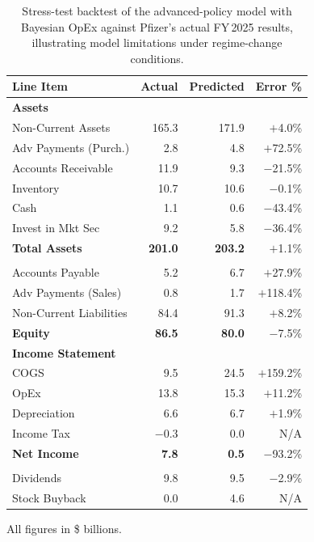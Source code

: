 \documentclass[12pt,a4paper]{article}
\begin{document}
\begin{table}[H]
\centering
\footnotesize

\begin{tabular}{l rrr}
\toprule
\textbf{Line Item} & \textbf{Actual} & \textbf{Predicted} & \textbf{Error \%} \\
\midrule
\multicolumn{4}{l}{\textbf{Assets}} \\
Non-Current Assets        & 165.3 & 171.9 & $+$4.0\% \\
Adv Payments (Purch.)     &   2.8 &   4.8 & $+$72.5\% \\
Accounts Receivable       &  11.9 &   9.3 & $-$21.5\% \\
Inventory                 &  10.7 &  10.6 & $-$0.1\% \\
Cash                      &   1.1 &   0.6 & $-$43.4\% \\
Invest in Mkt Sec         &   9.2 &   5.8 & $-$36.4\% \\
\textbf{Total Assets}     & \textbf{201.0} & \textbf{203.2} & $+$1.1\% \\
\addlinespace
\multicolumn{4}{l}{\textbf{Liabilities}} \\
Accounts Payable          &   5.2 &   6.7 & $+$27.9\% \\
Adv Payments (Sales)      &   0.8 &   1.7 & $+$118.4\% \\
Non-Current Liabilities   &  84.4 &  91.3 & $+$8.2\% \\
\textbf{Equity}           & \textbf{86.5} & \textbf{80.0} & $-$7.5\% \\
\midrule
\multicolumn{4}{l}{\textbf{Income Statement}} \\
COGS                      &   9.5 &  24.5 & $+$159.2\% \\
OpEx                      &  13.8 &  15.3 & $+$11.2\% \\
Depreciation              &   6.6 &   6.7 & $+$1.9\% \\
Income Tax                & $-$0.3 &   0.0 & N/A \\
\textbf{Net Income}       & \textbf{7.8} & \textbf{0.5} & $-$93.2\% \\
\addlinespace
\multicolumn{4}{l}{\textbf{Cash Flow}} \\
Dividends                 &   9.8 &   9.5 & $-$2.9\% \\
Stock Buyback             &   0.0 &   4.6 & N/A \\
\bottomrule
\end{tabular}
\par\smallskip
{\scriptsize All figures in \$ billions.}
\caption{Stress-test backtest of the advanced-policy model with Bayesian OpEx
against Pfizer's actual FY\,2025 results, illustrating model limitations under
regime-change conditions.}
\label{tab:backtest_pfe}
\end{table}
\end{document}
